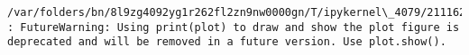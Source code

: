 \documentclass[11pt]{article}
\begin{document}
    \begin{Verbatim}[commandchars=\\\{\}]
/var/folders/bn/8l9zg4092yg1r262fl2zn9nw0000gn/T/ipykernel\_4079/2111622971.py:21
: FutureWarning: Using print(plot) to draw and show the plot figure is
deprecated and will be removed in a future version. Use plot.show().
    \end{Verbatim}

    \begin{center}
    \end{center}
    { \hspace*{\fill} \\}
    
    \begin{Verbatim}[commandchars=\\\{\}]

    \end{Verbatim}
\end{document}
